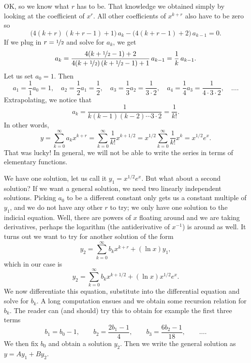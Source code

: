 \begin{example}
OK\@, so we know what $r$ has to be.  That knowledge we obtained simply by looking
at the coefficient of $x^r$.  All other
coefficients of $x^{k+r}$ also have to be zero so
\begin{equation*}
\bigl( 4 (k+r)\,(k+r-1) + 1 \bigr) \, a_k
-
\bigl( 4 (k+r-1) + 2 \bigr) \, a_{k-1} = 0 .
\end{equation*}
If we plug in $r=\nicefrac{1}{2}$ and solve for $a_k$, we get
\begin{equation*}
a_k
=
\frac{4 (k+\nicefrac{1}{2}-1) + 2}{4 (k+\nicefrac{1}{2})\,(k+\nicefrac{1}{2}-1) + 1} \, a_{k-1}
=
\frac{1}{k} \, a_{k-1} .
\end{equation*}
Let us set $a_0 = 1$.  Then
\begin{equation*}
a_1 = \frac{1}{1} a_0 = 1 ,
\quad
a_2 = \frac{1}{2} a_1 = \frac{1}{2} ,
\quad
a_3 = \frac{1}{3} a_2 = \frac{1}{3 \cdot 2} ,
\quad
a_4 = \frac{1}{4} a_3 = \frac{1}{4 \cdot 3 \cdot 2} ,
\quad \ldots .
\end{equation*}
Extrapolating, we notice that
\begin{equation*}
a_k = \frac{1}{k(k-1)(k-2) \cdots 3 \cdot 2} = \frac{1}{k!} .
\end{equation*}
In other words,
\begin{equation*}
y = 
\sum_{k=0}^\infty a_k x^{k+r}
=
\sum_{k=0}^\infty \frac{1}{k!} x^{k+1/2}
=
x^{1/2}
\sum_{k=0}^\infty \frac{1}{k!} x^{k}
=
x^{1/2}
e^x .
\end{equation*}
That was lucky!  In general, we will not be able to write the series in
terms of elementary functions.

We have one solution, let us call it $y_1 = x^{1/2} e^x$.
But what about a second solution?  If
we want a general solution, we need two linearly independent solutions.
Picking $a_0$ to be a different constant only gets us a constant
multiple of $y_1$, and we do not have any other $r$ to try; we only
have one solution to the indicial equation.  Well, there are powers of $x$
floating around and we are taking derivatives, perhaps the logarithm (the
antiderivative of $x^{-1}$) is around as well.  It turns out we want to
try for another solution of the form
\begin{equation*}
y_2 = \sum_{k=0}^\infty b_k x^{k+r} + (\ln x) y_1 ,
\end{equation*}
which in our case is
\begin{equation*}
y_2 = \sum_{k=0}^\infty b_k x^{k+1/2} + (\ln x) x^{1/2} e^x .
\end{equation*}
We now differentiate this equation, substitute into the differential
equation and solve for $b_k$.  A long computation ensues and we
obtain some recursion relation for $b_k$.  The reader
can (and should) try this to obtain for example the first three terms
\begin{equation*}
b_1 = b_0 -1 , \qquad b_2 = \frac{2b_1-1}{4} , \qquad b_3 =
\frac{6b_2-1}{18} , \qquad \ldots .
\end{equation*}
We then fix $b_0$ and obtain a solution $y_2$.  Then
we write the general solution as $y = A y_1 + B y_2$.
\end{example}

